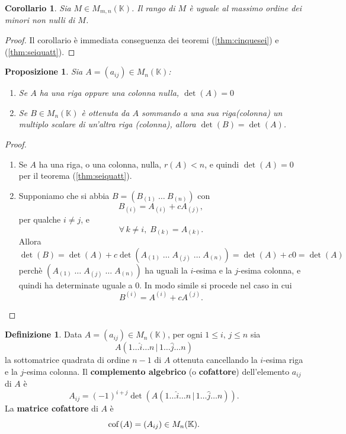\documentclass{article}
\theoremstyle{plain}
\newtheorem{prop}[thm]{Proposizione}
\newtheorem{cor}{Corollario}
\theoremstyle{definition}
\newtheorem{defn}{Definizione}[section]
\theoremstyle{remark}
\begin{document}
\vspace{10pt}

\begin{bxthm}
\begin{cor}\label{corseisei}
    Sia $M\in M_{m,n}(\mathbb{K})$. Il rango di $M$ è uguale al massimo ordine dei minori non nulli di $M$.
\end{cor}
\end{bxthm}
\begin{proof}
    Il corollario è immediata conseguenza dei teoremi (\ref{thm:cinquesei}) e (\ref{thm:seiquatt}).
\end{proof}

\vspace{10pt}

\begin{bxthm}
\begin{prop}
    Sia $A=(a_{ij})\in M_n(\mathbb{K})$:
    \begin{enumerate}
        \item Se $A$ ha una riga oppure una colonna nulla, $\det(A)=0$
        \item Se $B\in M_n(\mathbb{K})$ è ottenuta da $A$ sommando a una sua riga(colonna) un multiplo scalare di un'altra riga (colonna), allora $\det(B)=\det(A)$.
    \end{enumerate}
\end{prop}
\end{bxthm}
\begin{proof}\hfill
    \begin{enumerate}
        \item Se $A$ ha una riga, o una colonna, nulla, $r(A)<n$, e quindi $\det(A)=0$ per il teorema (\ref{thm:seiquatt}).
        \item Supponiamo che si abbia $B=(B_{(1)} \ \dots \ B_{(n)})$ con \[B_{(i)}=A_{(i)}+cA_{(j)},\] per qualche $i\neq j$, e \[\forall\,k\neq i,\;B_{(k)}=A_{(k)}.\]
        Allora \[\det(B)=\det(A)+c\det(A_{(1)}\;\dots\;A_{(j)}\;\dots\;A_{(n)})=\det(A)+c0=\det(A)\]
        perchè $(A_{(1)}\;\dots\;A_{(j)}\;\dots\;A_{(n)})$ ha uguali la $i$-esima e la $j$-esima colonna, e quindi ha determinate uguale a $0$.
        In modo simile si procede nel caso in cui \[B^{(i)}=A^{(i)}+cA^{(j)}.\]
    \end{enumerate}
\end{proof}

\vspace{10pt}

\begin{bxthm}
\begin{defn}
    Data $A=(a_{ij})\in M_n(\mathbb{K})$, per ogni $1\leq i,\, j\leq n$ sia 
    \[A(1\ldots\hat{i}\ldots n\,|\,1\ldots\hat{j}\ldots n)\] 
    la sottomatrice quadrata di ordine $n-1$ di $A$ ottenuta cancellando la $i$-esima riga e la $j$-esima colonna.
    Il \textbf{complemento algebrico} (o \textbf{cofattore}) dell'elemento $a_{ij}$ di $A$ è 
    \[A_{ij}=(-1)^{i+j}\det(A(1\ldots\hat{i}\ldots n\,|\,1\ldots\hat{j}\ldots n)).\]
    La \textbf{matrice cofattore} di $A$ è 
    \[\textup{cof}\,(A)=(A_{ij})\in M_n(\mathbb{K}).\]
\end{defn}
\end{bxthm}
\end{document}
